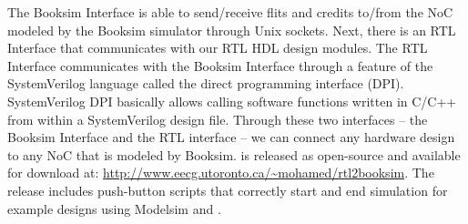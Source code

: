 The Booksim Interface is able to send/receive flits and credits to/from the NoC modeled by the Booksim simulator through Unix sockets.
Next, there is an RTL Interface that communicates with our RTL HDL design modules.
The RTL Interface communicates with the Booksim Interface through a feature of the SystemVerilog language called the direct programming interface (DPI).
SystemVerilog DPI basically allows calling software functions written in C/C++ from within a SystemVerilog design file.
Through these two interfaces -- the Booksim Interface and the RTL interface -- we can connect any hardware design to any NoC that is modeled by Booksim.
\rtlbook{ }is released as open-source and available for download at: \url{http://www.eecg.utoronto.ca/~mohamed/rtl2booksim}.
The release includes push-button scripts that correctly start and end simulation for example designs using Modelsim and \rtlbook.
